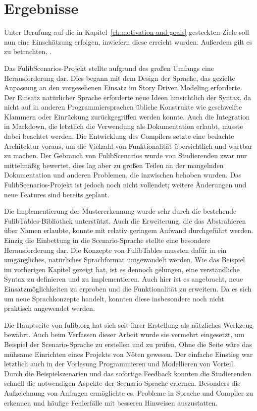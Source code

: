 \chapter{Ergebnisse}\label{ch:ergebnisse}

Unter Berufung auf die in Kapitel~\ref{ch:motivation-and-goals} gesteckten Ziele soll nun eine Einschätzung erfolgen, inwiefern diese erreicht wurden.
Außerdem gilt es zu betrachten, .

Das FulibScenarios-Projekt stellte aufgrund des großen Umfangs eine Herausforderung dar.
Dies begann mit dem Design der Sprache, das gezielte Anpassung an den vorgesehenen Einsatz im Story Driven Modeling erforderte.
Der Einsatz natürlicher Sprache erforderte neue Ideen hinsichtlich der Syntax, da nicht auf in anderen Programmiersprachen übliche Konstrukte wie geschweifte Klammern oder Einrückung zurückgegriffen werden konnte.
Auch die Integration in Markdown, die letztlich die Verwendung als Dokumentation erlaubt, musste dabei beachtet werden.
Die Entwicklung des Compilers setzte eine bedachte Architektur voraus, um die Vielzahl von Funktionalität übersichtlich und wartbar zu machen.
Der Gebrauch von FulibScenarios wurde von Studierenden zwar nur mittelmäßig bewertet,
dies lag aber zu großen Teilen an der mangelnden Dokumentation und anderen Problemen, die inzwischen behoben wurden.
Das FulibScenarios-Projekt ist jedoch noch nicht vollendet;
weitere Änderungen und neue Features sind bereits geplant.

Die Implementierung der Mustererkennung wurde sehr durch die bestehende FulibTables-Bibliothek unterstützt.
Auch die Erweiterung, die das Abstrahieren über Namen erlaubte, konnte mit relativ geringem Aufwand durchgeführt werden.
Einzig die Einbettung in die Scenario-Sprache stellte eine besondere Herausforderung dar.
Die Konzepte von FulibTables mussten dafür in ein umgängliches, natürliches Sprachformat umgewandelt werden.
Wie das Beispiel im vorherigen Kapitel gezeigt hat, ist es dennoch gelungen, eine verständliche Syntax zu definieren und zu implementieren.
Auch hier ist es angebracht, neue Einsatzmöglichkeiten zu erproben und die Funktionalität zu erweitern.
Da es sich um neue Sprachkonzepte handelt, konnten diese insbesondere noch nicht praktisch angewendet werden.

Die Hauptseite von fulib.org hat sich seit ihrer Erstellung als nützliches Werkzeug bewährt.
Auch beim Verfassen dieser Arbeit wurde sie vermehrt eingesetzt, um Beispiel der Scenario-Sprache zu erstellen und zu prüfen.
Ohne die Seite wäre das mühsame Einrichten eines Projekts von Nöten gewesen.
Der einfache Einstieg war letztlich auch in der Vorlesung Programmieren und Modellieren von Vorteil.
Durch die Beispielszenarien und das sofortige Feedback konnten die Studierenden schnell die notwendigen Aspekte der Scenario-Sprache erlernen.
Besonders die Aufzeichnung von Anfragen ermöglichte es, Probleme in Sprache und Compiler zu erkennen und häufige Fehlerfälle mit besseren Hinweisen auszustatten.

